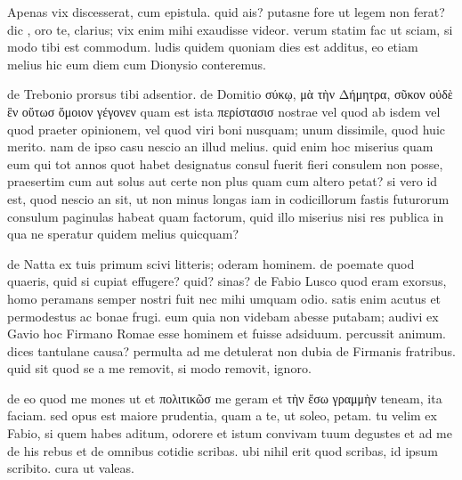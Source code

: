


 Apenas vix discesserat, cum epistula. quid ais? putasne fore ut legem non ferat? dic , oro te, clarius; vix enim mihi exaudisse videor. verum statim fac ut sciam, si modo tibi est commodum. ludis quidem quoniam dies est additus, eo etiam melius hic eum diem cum Dionysio conteremus.

 de Trebonio prorsus tibi adsentior. de Domitio σύκῳ, μὰ τὴν Δήμητρα, σῦκον οὐδὲ ἓν οὕτωσ ὅμοιον γέγονεν quam est ista περίστασισ nostrae vel quod ab isdem vel quod praeter opinionem, vel quod viri boni nusquam; unum dissimile, quod huic merito. nam de ipso casu nescio an illud melius. quid enim hoc miserius quam eum qui tot annos quot habet designatus consul fuerit fieri consulem non posse, praesertim cum aut solus aut certe non plus quam cum altero petat? si vero id est, quod nescio an sit, ut non minus longas iam in codicillorum fastis futurorum consulum paginulas habeat quam factorum, quid illo miserius nisi res publica in qua ne speratur quidem melius quicquam?

 de Natta ex tuis primum scivi litteris; oderam hominem. de poemate quod quaeris, quid si cupiat effugere? quid? sinas? de Fabio Lusco quod eram exorsus, homo peramans semper nostri fuit nec mihi umquam odio. satis enim acutus et permodestus ac bonae frugi. eum quia non videbam abesse putabam; audivi ex Gavio hoc Firmano Romae esse hominem et fuisse adsiduum. percussit animum. dices tantulane causa? permulta ad me detulerat non dubia de Firmanis fratribus. quid sit quod se a me removit, si modo removit, ignoro.

 de eo quod me mones ut et πολιτικῶσ me geram et τὴν ἔσω γραμμὴν teneam, ita faciam. sed opus est maiore prudentia, quam a te, ut soleo, petam. tu velim ex Fabio, si quem habes aditum, odorere et istum convivam tuum degustes et ad me de his rebus et de omnibus cotidie scribas. ubi nihil erit quod scribas, id ipsum scribito. cura ut valeas.
